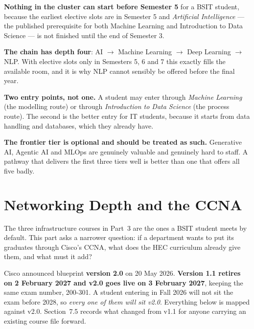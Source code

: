 \documentclass[11pt,a4paper,oneside]{report}
\begin{document}
\begin{tight}
  \item \textbf{Nothing in the cluster can start before Semester 5} for a BSIT
        student, because the earliest elective slots are in Semester 5 and
        \emph{Artificial Intelligence} --- the published prerequisite for both
        Machine Learning and Introduction to Data Science --- is not finished
        until the end of Semester 3.
  \item \textbf{The chain has depth four}: AI $\rightarrow$ Machine Learning
        $\rightarrow$ Deep Learning $\rightarrow$ NLP. With elective slots only
        in Semesters 5, 6 and 7 this exactly fills the available room, and it is
        why NLP cannot sensibly be offered before the final year.
  \item \textbf{Two entry points, not one.} A student may enter through
        \emph{Machine Learning} (the modelling route) or through
        \emph{Introduction to Data Science} (the process route). The second is
        the better entry for IT students, because it starts from data handling
        and databases, which they already have.
  \item \textbf{The frontier tier is optional and should be treated as such.}
        Generative AI, Agentic AI and MLOps are genuinely valuable and genuinely
        hard to staff. A pathway that delivers the first three tiers well is
        better than one that offers all five badly.
\end{tight}

\section{Networking Depth and the CCNA}

The three infrastructure courses in Part~3 are the ones a BSIT student meets by
default. This part asks a narrower question: if a department wants to put its
graduates through Cisco's CCNA, what does the HEC curriculum already give them,
and what must it add?

\begin{warnbox}
Cisco announced blueprint \textbf{version 2.0} on 20 May 2026. \textbf{Version
1.1 retires on 2 February 2027 and v2.0 goes live on 3 February 2027}, keeping
the same exam number, 200-301. A student entering in Fall 2026 will not sit the
exam before 2028, so \emph{every one of them will sit v2.0}. Everything below is
mapped against v2.0. Section~7.5 records what changed from v1.1 for anyone
carrying an existing course file forward.
\end{warnbox}
\end{document}
